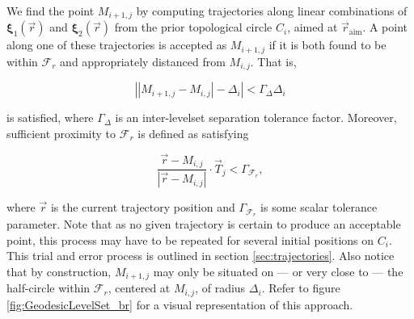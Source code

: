 We find the point $M_{i+1,j}$ by computing trajectories along linear combinations of $\bm{\xi}_1(\vec{r})$ and $\bm{\xi}_2(\vec{r})$ from the prior topological circle $C_i$, aimed at $\vec{r}_{\text{aim}}$. A point along one of these trajectories is accepted as $M_{i+1,j}$ if it is both found to be within $\mathcal{F}_r$ and appropriately distanced from $M_{i,j}$. That is,

\begin{equation}\label{eq:within_dist_tol}
\left| \left| M_{i+1,j} - M_{i,j} \right| - \Delta_i \right| < \Gamma_{\Delta}\Delta_i
\end{equation}

\noindent is satisfied, where $\Gamma_{\Delta}$ is an inter-levelset separation tolerance factor. Moreover, sufficient proximity to $\mathcal{F}_r$ is defined as satisfying


\begin{equation}\label{eq:in_plane}
\frac{\vec{r} - M_{i,j}}{\left|\vec{r} - M_{i,j}\right|} \cdot \vec{T}_j< \Gamma_{\mathcal{F}_r},
\end{equation}

\noindent where $\vec{r}$ is the current trajectory position and $\Gamma_{\mathcal{F}_r}$ is some scalar tolerance parameter. Note that as no given trajectory is certain to produce an acceptable point, this process may have to be repeated for several initial positions on $C_i$. This trial and error process is outlined in section \ref{sec:trajectories}. Also notice that by construction, $M_{i+1,j}$ may only be situated on --- or very close to --- the half-circle within $\mathcal{F}_r$, centered at $M_{i,j}$, of radius $\Delta_i$. Refer to figure \ref{fig:GeodesicLevelSet_br} for a visual representation of this approach. 

